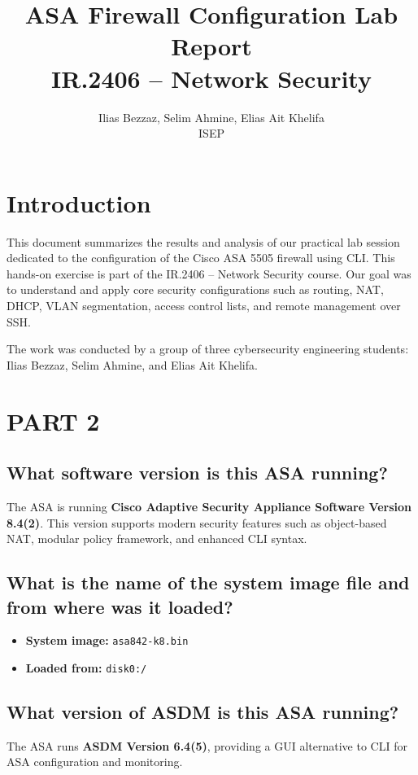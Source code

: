 \documentclass[a4paper,11pt]{article}
\title{\textbf{ASA Firewall Configuration Lab Report}\\
\large IR.2406 – Network Security}
\author{Ilias Bezzaz, Selim Ahmine, Elias Ait Khelifa\\
ISEP}
\date{}
\begin{document}
\maketitle

\section*{Introduction}
This document summarizes the results and analysis of our practical lab session dedicated to the configuration of the Cisco ASA 5505 firewall using CLI. This hands-on exercise is part of the IR.2406 – Network Security course. Our goal was to understand and apply core security configurations such as routing, NAT, DHCP, VLAN segmentation, access control lists, and remote management over SSH.

\vspace{1em}
The work was conducted by a group of three cybersecurity engineering students: Ilias Bezzaz, Selim Ahmine, and Elias Ait Khelifa.

\section*{PART 2}

\subsection*{What software version is this ASA running?}
The ASA is running \textbf{Cisco Adaptive Security Appliance Software Version 8.4(2)}. This version supports modern security features such as object-based NAT, modular policy framework, and enhanced CLI syntax.

\subsection*{What is the name of the system image file and from where was it loaded?}
\begin{itemize}
    \item \textbf{System image:} \texttt{asa842-k8.bin}
    \item \textbf{Loaded from:} \texttt{disk0:/}
\end{itemize}

\subsection*{What version of ASDM is this ASA running?}
The ASA runs \textbf{ASDM Version 6.4(5)}, providing a GUI alternative to CLI for ASA configuration and monitoring.
\end{document}
